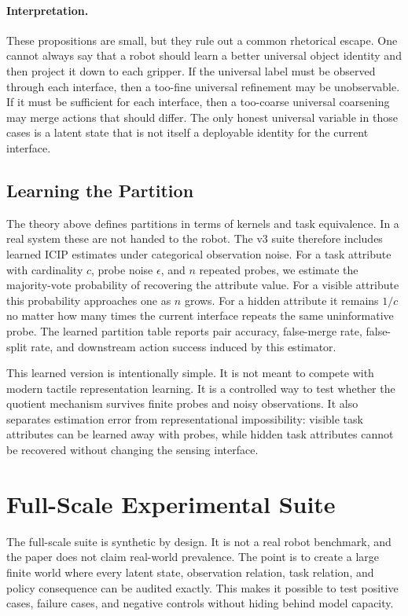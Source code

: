 \documentclass{article}
\newcommand{\icip}{\textsc{ICIP}}
\begin{document}
\paragraph{Interpretation.}
These propositions are small, but they rule out a common rhetorical escape.
One cannot always say that a robot should learn a better universal object identity and then project it down to each gripper.
If the universal label must be observed through each interface, then a too-fine universal refinement may be unobservable.
If it must be sufficient for each interface, then a too-coarse universal coarsening may merge actions that should differ.
The only honest universal variable in those cases is a latent state that is not itself a deployable identity for the current interface.

\subsection{Learning the Partition}

The theory above defines partitions in terms of kernels and task equivalence.
In a real system these are not handed to the robot.
The v3 suite therefore includes learned \icip{} estimates under categorical observation noise.
For a task attribute with cardinality $c$, probe noise $\epsilon$, and $n$ repeated probes, we estimate the majority-vote probability of recovering the attribute value.
For a visible attribute this probability approaches one as $n$ grows.
For a hidden attribute it remains $1/c$ no matter how many times the current interface repeats the same uninformative probe.
The learned partition table reports pair accuracy, false-merge rate, false-split rate, and downstream action success induced by this estimator.

This learned version is intentionally simple.
It is not meant to compete with modern tactile representation learning.
It is a controlled way to test whether the quotient mechanism survives finite probes and noisy observations.
It also separates estimation error from representational impossibility: visible task attributes can be learned away with probes, while hidden task attributes cannot be recovered without changing the sensing interface.

\section{Full-Scale Experimental Suite}
\label{sec:experiments}

The full-scale suite is synthetic by design.
It is not a real robot benchmark, and the paper does not claim real-world prevalence.
The point is to create a large finite world where every latent state, observation relation, task relation, and policy consequence can be audited exactly.
This makes it possible to test positive cases, failure cases, and negative controls without hiding behind model capacity.
\end{document}
